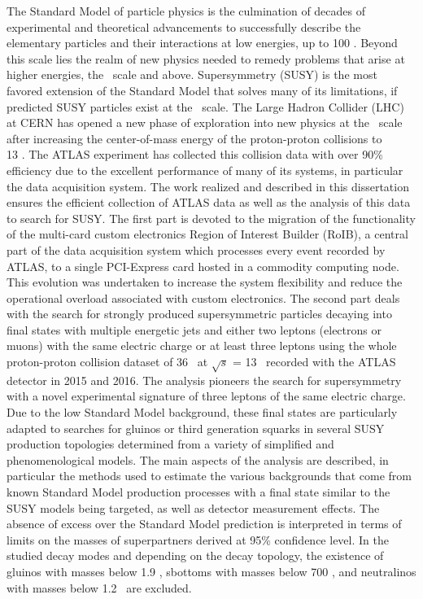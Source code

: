 The Standard Model of particle physics is the culmination of decades of experimental and theoretical advancements
to successfully describe the elementary particles and their interactions at low energies, up to 100 \GeV. 
Beyond this scale lies the realm of new physics needed to remedy problems that arise at higher energies, the \TeV~scale and above. 
Supersymmetry (SUSY) is the most favored extension of the Standard Model that solves many of its limitations, if predicted 
SUSY particles exist at the \TeV~scale.
The Large Hadron Collider (LHC) at CERN has opened a new phase of exploration into new physics at the \TeV~scale 
after increasing the center-of-mass energy of the proton-proton collisions to \\13 \TeV. 
The ATLAS experiment has collected this collision data with over 90\% efficiency due to the excellent performance 
of many of its systems, in particular the data acquisition system.
The work realized and described in this dissertation ensures the efficient collection of ATLAS data as well as the analysis 
of this data to search for SUSY.
The first part is devoted to the migration of the functionality of the multi-card custom electronics 
Region of Interest Builder (RoIB), a central part of the data acquisition system which processes every event recorded by ATLAS, to a single 
PCI-Express card hosted in a commodity computing node. This evolution was undertaken to 
increase the system flexibility and reduce the operational overload associated with custom electronics.
The second part deals with the search for strongly produced supersymmetric particles decaying into final 
states with multiple energetic jets and either two leptons (electrons or muons) with the same electric 
charge or at least three leptons using the whole proton-proton collision dataset of 36 \ifb~at 
$\sqrt{s}$ = 13 \TeV~recorded with the ATLAS detector in 2015 and 2016.
The analysis pioneers the search for supersymmetry with a novel experimental signature of three leptons of the same 
electric charge.
Due to the low Standard Model background, these final states are particularly adapted to searches for gluinos or third generation
squarks in several SUSY production topologies determined from a variety of simplified and phenomenological models.
The main aspects of the analysis are described, in particular the methods used to estimate the various backgrounds that come 
from known Standard Model production processes with a final state similar to the SUSY models being targeted, 
as well as detector measurement effects.
The absence of excess over the Standard Model prediction  is interpreted in 
terms of limits on the masses of superpartners derived at 95\% confidence 
level. In the studied decay modes and depending on the decay topology, the existence of gluinos with masses below
1.9 \TeV, sbottoms with masses below 700 \GeV, and neutralinos with masses 
below 1.2 \TeV~are excluded.
